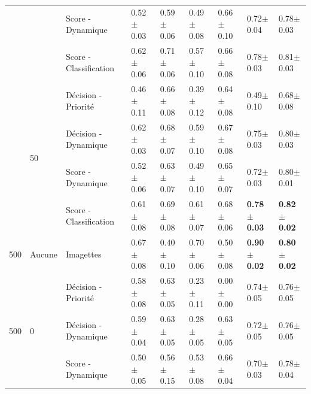 \begin{landscape}
\begin{table}[]
\begin{tabular}{lllllllll}
							        &                                   & Score - Dynamique               & 0.52$\pm$0.03         & 0.59$\pm$0.06     & 0.49$\pm$0.08         & 0.66$\pm$0.10     & 0.72$\pm$0.04         & 0.78$\pm$0.03         \\
							        &                                   & Score - Classification                    & 0.62$\pm$0.06         & 0.71$\pm$0.06     & 0.57$\pm$0.10         & 0.66$\pm$0.08     & 0.78$\pm$0.03         & 0.81$\pm$0.03         \\ \cline{2-9}
							        & \multirow{4}{*}{50}               & Décision - Priorité                    & 0.46$\pm$0.11         & 0.66$\pm$0.08     & 0.39$\pm$0.12         & 0.64$\pm$0.08     & 0.49$\pm$0.10         & 0.68$\pm$0.08         \\
							        &                                   & Décision - Dynamique                    & 0.62$\pm$0.03         & 0.68$\pm$0.07     & 0.59$\pm$0.10         & 0.67$\pm$0.08     & 0.75$\pm$0.03         & 0.80$\pm$0.03         \\
							        &                                   & Score - Dynamique               & 0.52$\pm$0.06         & 0.63$\pm$0.07     & 0.49$\pm$0.10         & 0.65$\pm$0.07     & 0.72$\pm$0.03         & 0.80$\pm$0.01         \\ 
		                            &                                   & Score - Classification                    & 0.61$\pm$0.08         & 0.69$\pm$0.08     & 0.61$\pm$0.07         & 0.68$\pm$0.06     & \textbf{0.78$\pm$0.03}& \textbf{0.82$\pm$0.02}\\ \midrule
		500                         & Aucune                            & Imagettes                 & 0.67$\pm$0.08         & 0.40$\pm$0.10     & 0.70$\pm$0.06         & 0.50$\pm$0.08     & \textbf{0.90$\pm$0.02}& \textbf{0.80$\pm$0.02}\\ \midrule
		\multirow{12}{*}{500}       & \multirow{4}{*}{0}                & Décision - Priorité                    & 0.58$\pm$0.08         & 0.63$\pm$0.05     & 0.23$\pm$0.11         & 0.00$\pm$0.00     & 0.74$\pm$0.05         & 0.76$\pm$0.05         \\
							        &                                   & Décision - Dynamique                    & 0.59$\pm$0.04         & 0.63$\pm$0.05     & 0.28$\pm$0.05         & 0.63$\pm$0.05     & 0.72$\pm$0.05         & 0.76$\pm$0.05         \\
							        &                                   & Score - Dynamique               & 0.50$\pm$0.05         & 0.56$\pm$0.15     & 0.53$\pm$0.08         & 0.66$\pm$0.04     & 0.70$\pm$0.03         & 0.78$\pm$0.04         \\

\end{tabular}
\end{table}
\end{landscape}
